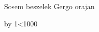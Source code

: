 \def\sosem#1{Sosem beszelek #1 orajan\par}
\def\gs{\sosem{Gergo}}


{
\newcount\ezerszer
\loop\gs\advance\ezerszer by 1\ifnum\ezerszer<1000\repeat
}

\bye
